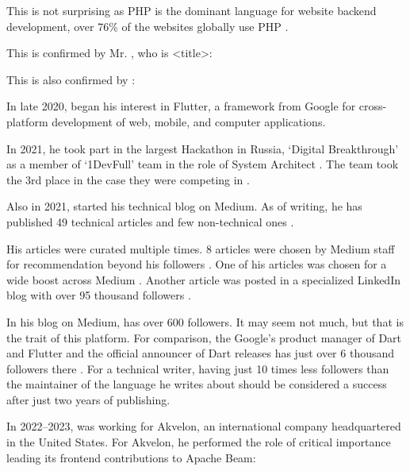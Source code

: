 This is not surprising as PHP is the dominant language for website backend development,
over 76\% of the websites globally use PHP .

This is confirmed by Mr. \MrPhpOne, who is <title>:


This is also confirmed by \MrPhpTwoT:


In late 2020, \mrl began his interest in Flutter, a framework from Google for cross-platform
development of web, mobile, and computer applications.

In 2021, he took part in the largest Hackathon in Russia, `Digital Breakthrough'
as a member of `1DevFull' team in the role of System Architect .
The team took the 3rd place in the case they were competing in .

Also in 2021, \mrl started his technical blog on Medium.
As of writing, he has published 49 technical articles %
and few non-technical ones
.

His articles were curated multiple times.
8 articles were chosen by Medium staff for recommendation beyond his followers .
One of his articles was chosen for a wide boost across Medium .
Another article was posted in a specialized LinkedIn blog with over 95 thousand followers .

In his blog on Medium, \mrl has over 600 followers. %
It may seem not much, but that is the trait of this platform.
For comparison, the Google's product manager of Dart and Flutter
and the official announcer of Dart releases has just over 6 thousand followers there
.
For a technical writer, having just 10 times less followers %
than the maintainer of the language
he writes about should be considered a success after just two years of publishing.

In 2022--2023, \mrl was working for Akvelon, an international company headquartered in the United States.
For Akvelon, he performed the role of critical importance
leading its frontend contributions to Apache Beam:

